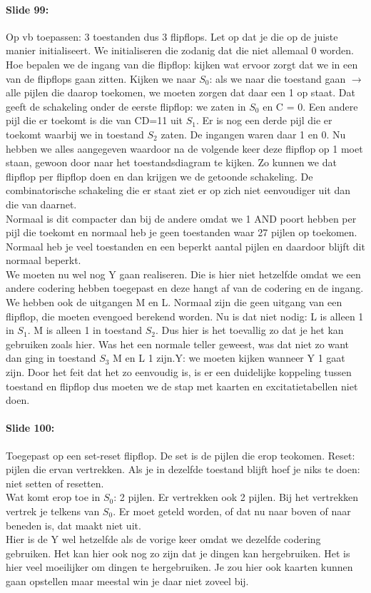 \documentclass[10pt,a4paper]{book}
\begin{document}
\paragraph{Slide 99:} Op vb toepassen: 3 toestanden dus 3 flipflops. Let op dat je die op de juiste manier initialiseert. We initialiseren die zodanig dat die niet allemaal 0 worden. Hoe bepalen we de ingang van die flipflop: kijken wat ervoor zorgt dat we in een van de flipflops gaan zitten. Kijken we naar $S_0$: als we naar die toestand gaan $\rightarrow$ alle pijlen die daarop toekomen, we moeten zorgen dat daar een 1 op staat. Dat geeft de schakeling onder de eerste flipflop: we zaten in $S_0$ en C = 0. Een andere pijl die er toekomt is die van CD=11 uit $S_1$. Er is nog een derde pijl die er toekomt waarbij we in toestand $S_2$ zaten. De ingangen waren daar 1 en 0. Nu hebben we alles aangegeven waardoor na de volgende keer deze flipflop op 1 moet staan, gewoon door naar het toestandsdiagram te kijken. Zo kunnen we dat flipflop per flipflop doen en dan krijgen we de getoonde schakeling. De combinatorische schakeling die er staat ziet er op zich niet eenvoudiger uit dan die van daarnet.\\
Normaal is dit compacter dan bij de andere omdat we 1 AND poort hebben per pijl die toekomt en normaal heb je geen toestanden waar 27 pijlen op toekomen. Normaal heb je veel toestanden en een beperkt aantal pijlen en daardoor blijft dit normaal beperkt.\\
We moeten nu wel nog Y gaan realiseren. Die is hier niet hetzelfde omdat we een andere codering hebben toegepast en deze hangt af van de codering en de ingang. We hebben ook de uitgangen M en L. Normaal zijn die geen uitgang van een flipflop, die moeten evengoed berekend worden. Nu is dat niet nodig: L is alleen 1 in $S_1$. M is alleen 1 in toestand $S_2$. Dus hier is het toevallig zo dat je het kan gebruiken zoals hier. Was het een normale teller geweest, was dat niet zo want dan ging in toestand $S_3$ M en L 1 zijn.Y: we moeten kijken wanneer Y 1 gaat zijn. Door het feit dat het zo eenvoudig is, is er een duidelijke koppeling tussen toestand en flipflop dus moeten we de stap met kaarten en excitatietabellen niet doen.

\paragraph{Slide 100:} Toegepast op een set-reset flipflop. De set is de pijlen die erop teokomen. Reset: pijlen die ervan vertrekken. Als je in dezelfde toestand blijft hoef je niks te doen: niet setten of resetten.\\
Wat komt erop toe in $S_0$: 2 pijlen. Er vertrekken ook 2 pijlen. Bij het vertrekken vertrek je telkens van $S_0$. Er moet geteld worden, of dat nu naar boven of naar beneden is, dat maakt niet uit.\\
Hier is de Y wel hetzelfde als de vorige keer omdat we dezelfde codering gebruiken. Het kan hier ook nog zo zijn dat je dingen kan hergebruiken. Het is hier veel moeilijker om dingen te hergebruiken. Je zou hier ook kaarten kunnen gaan opstellen maar meestal win je daar niet zoveel bij.
\end{document}
